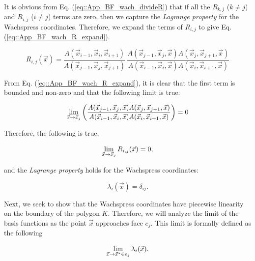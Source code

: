 \noindent It is obvious from Eq. (\ref{eq::App_BF_wach_divideR}) that if all the $R_{k,j}$ ($k \neq j$) and $R_{i,j}$ ($i \neq j$) terms are zero, then we capture the {\em Lagrange property} for the Wachspress coordinates. Therefore, we expand the terms of $R_{i,j}$ to give Eq. (\ref{eq::App_BF_wach_R_expand}).

\begin{equation}
\label{eq::App_BF_wach_R_expand}
R_{i,j}(\vec{x}) = \frac{A(\vec{x}_{i-1}, \vec{x}_{i}, \vec{x}_{i+1})}{A(\vec{x}_{j-1}, \vec{x}_{j}, \vec{x}_{j+1})} \, \frac{A(\vec{x}_{j-1}, \vec{x}_{j}, \vec{x}) A(\vec{x}_{j}, \vec{x}_{j+1}, \vec{x})}{A(\vec{x}_{i-1}, \vec{x}_{i}, \vec{x}) A(\vec{x}_{i}, \vec{x}_{i+1}, \vec{x})}
\end{equation}

\noindent From Eq. (\ref{eq::App_BF_wach_R_expand}), it is clear that the first term is bounded and non-zero and that the following limit is true:

\begin{equation}
\label{eq::App_BF_wach_vertlim}
\lim\displaylimits_{\vec{x}\rightarrow \vec{x}_j} \left(  \frac{A(\vec{x}_{j-1}, \vec{x}_{j}, \vec{x}) A(\vec{x}_{j}, \vec{x}_{j+1}, \vec{x})}{A(\vec{x}_{i-1}, \vec{x}_{i}, \vec{x}) A(\vec{x}_{i}, \vec{x}_{i+1}, \vec{x})} \right) = 0
\end{equation}

\noindent Therefore, the following is true,

\begin{equation}
\label{eq::App_BF_wach_Rlim}
\lim\displaylimits_{\vec{x} \rightarrow \vec{x}_j} R_{i,j}(\vec{x}) = 0 ,
\end{equation} 

\noindent and the {\em Lagrange property} holds for the Wachspress coordinates:

\begin{equation}
\label{eq::App_BF_wach_vertFINAL}
\lambda_i (\vec{x}) = \delta_{ij}.
\end{equation} 

Next, we seek to show that the Wachspress coordinates have piecewise linearity on the boundary of the polygon $K$. Therefore, we will analyze the limit of the basis functions as the point $\vec{x}$ approaches face $e_j$. This limit is formally defined as the following

\begin{equation}
\label{eq::App_BF_wach_edge_lim_init}
\lim\displaylimits_{\vec{x} \rightarrow \vec{x}^* \in e_j}  \lambda_i (\vec{x}) .
\end{equation} 

